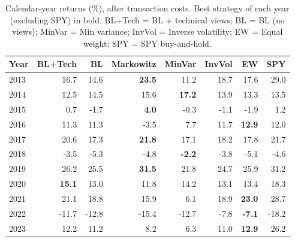 \begin{table}[t]
\centering
\small
\caption{Calendar-year returns (\%), after transaction costs. Best strategy of each year (excluding SPY) in bold. BL+Tech = BL + technical views; BL = BL (no views); MinVar = Min variance; InvVol = Inverse volatility; EW = Equal weight; SPY = SPY buy-and-hold.}
\label{tab:annual}
\begin{tabular}{lrrrrrrr}
\toprule
Year & BL+Tech & BL & Markowitz & MinVar & InvVol & EW & SPY \\
\midrule
2013 & 16.7 & 14.6 & \textbf{23.5} & 11.2 & 18.7 & 17.6 & 29.0 \\
2014 & 12.5 & 14.5 & 15.6 & \textbf{17.2} & 13.9 & 13.3 & 13.5 \\
2015 & 0.7 & -1.7 & \textbf{4.0} & -0.3 & -1.1 & -1.9 & 1.2 \\
2016 & 11.3 & 11.3 & -3.5 & 7.7 & 11.7 & \textbf{12.9} & 12.0 \\
2017 & 20.6 & 17.3 & \textbf{21.8} & 17.1 & 18.2 & 17.8 & 21.7 \\
2018 & -3.5 & -5.3 & -4.8 & \textbf{-2.2} & -3.8 & -5.1 & -4.6 \\
2019 & 26.2 & 25.5 & \textbf{31.5} & 21.8 & 24.7 & 25.9 & 31.2 \\
2020 & \textbf{15.1} & 13.0 & 11.8 & 14.2 & 13.1 & 13.4 & 18.3 \\
2021 & 21.1 & 18.8 & 15.9 & 6.1 & 18.9 & \textbf{23.0} & 28.7 \\
2022 & -11.7 & -12.8 & -15.4 & -12.7 & -7.8 & \textbf{-7.1} & -18.2 \\
2023 & 12.2 & 11.2 & 8.2 & 6.3 & 11.0 & \textbf{12.9} & 26.2 \\
\bottomrule
\end{tabular}
\end{table}
